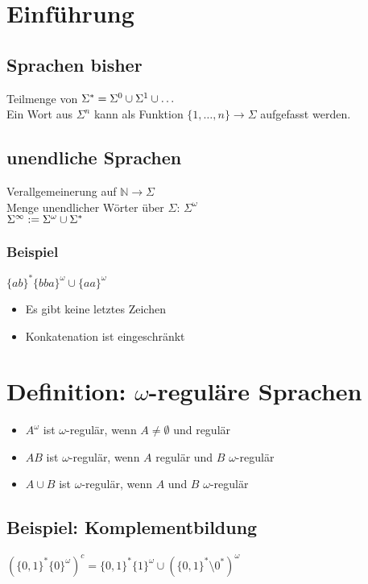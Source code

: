 \section{Einführung}
    \subsection{Sprachen bisher}
        Teilmenge von $\Sigma^*=\Sigma^0\cup\Sigma^1\cup\dots$\\
        Ein Wort aus $\Sigma^n$ kann als Funktion $\{1,\dots,n\}\rightarrow\Sigma$ aufgefasst werden.\\
    \subsection{unendliche Sprachen}
        Verallgemeinerung auf $\mathds{N}\rightarrow\Sigma$\\
        Menge unendlicher Wörter über $\Sigma$: $\Sigma^\omega$\\
        $\Sigma^\infty:=\Sigma^\omega\cup\Sigma^*$
        \subsubsection{Beispiel}
            $\{ab\}^*\{bba\}^\omega\cup\{aa\}^\omega$
            \begin{itemize}
                \item Es gibt keine letztes Zeichen
                \item Konkatenation ist eingeschränkt
            \end{itemize}
\section{Definition: $\omega$-reguläre Sprachen}
    \begin{itemize}
        \item $A^\omega$ ist $\omega$-regulär, wenn $A\not=\emptyset$ und regulär
        \item $AB$ ist $\omega$-regulär, wenn $A$ regulär und $B$ $\omega$-regulär
        \item $A\cup B$ ist $\omega$-regulär, wenn $A$ und $B$ $\omega$-regulär
    \end{itemize}
    \subsection{Beispiel: Komplementbildung}
        $\left(\{0,1\}^*\{0\}^\omega\right)^c=\{0,1\}^*\{1\}^\omega\cup\left(\{0,1\}^*\setminus0^*\right)^\omega$
